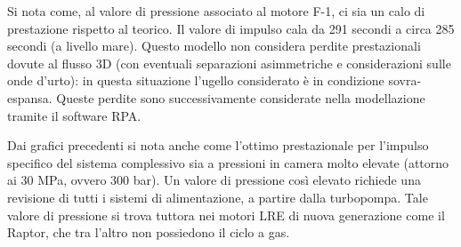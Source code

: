 
Si nota come, al valore di pressione associato al motore F-1, ci sia un calo di prestazione rispetto al teorico. Il valore di impulso cala da 291 secondi a circa 285 secondi (a livello mare). Questo modello non considera perdite prestazionali dovute al flusso 3D (con eventuali separazioni asimmetriche e considerazioni sulle onde d'urto): in questa situazione l'ugello considerato è in condizione sovra-espansa. Queste perdite sono successivamente considerate nella modellazione tramite il software RPA.

Dai grafici precedenti si nota anche come l'ottimo prestazionale per l'impulso specifico del sistema complessivo sia a pressioni in camera molto elevate (attorno ai 30 MPa, ovvero 300 bar). Un valore di pressione così elevato richiede una revisione di tutti i sistemi di alimentazione, a partire dalla turbopompa. Tale valore di pressione si trova tuttora nei motori LRE di nuova generazione come il Raptor, che tra l'altro non possiedono il ciclo a gas.